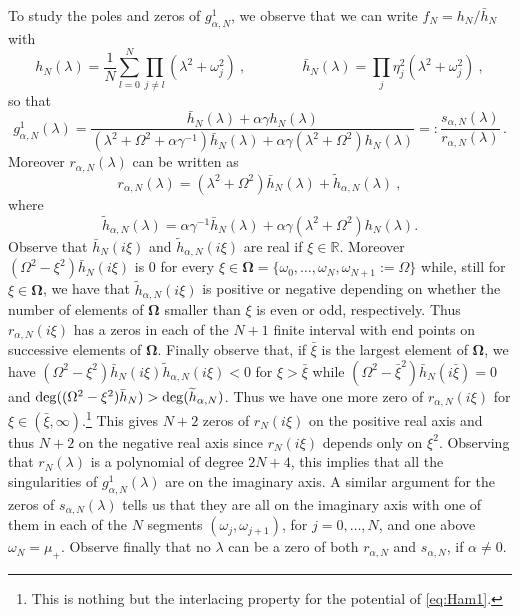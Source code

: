 \documentclass[11pt]{article}
\numberwithin{equation}{section}
\numberwithin{theorem}{section}
\def\tilde#1{\widetilde{#1}}
\begin{document}
To study the poles and zeros of $g^1_{\alpha,N}$, we observe that we can write $f_N=h_N/\bar h_N$ with
\[
 h_N(\lambda)=\frac 1N
\sum_{l=0}^N\prod_{j\not=l}(\lambda^2+\omega_j^2)\ ,\qquad\qquad \bar
h_N(\lambda)=\prod_{j}\eta_j^2(\lambda^2+\omega_j^2)\ ,
\]
so that
\[
 g^1_{\alpha,N}(\lambda)=\frac{\bar h_N(\lambda)+\alpha\gamma
h_N(\lambda)}{(\lambda^2+\Omega^2+\alpha\gamma^{-1})\bar h_N(\lambda)+
\alpha\gamma(\lambda^2+\Omega^2)h_N(\lambda)}=:\frac{s_{\alpha,N}(\lambda)}{r_{\alpha,N}(\lambda)}\, .
\]
Moreover $r_{\alpha,N}(\lambda)$ can be written as
\[
 r_{\alpha,N}(\lambda)=(\lambda^2+\Omega^2)\bar h_N(\lambda)+ \tilde
 h_{\alpha,N}(\lambda)\ ,
\]
where
\[
 \tilde h_{\alpha,N}(\lambda)=\alpha\gamma^{-1}\bar
h_N(\lambda)+\alpha\gamma(\lambda^2+\Omega^2)h_N(\lambda).
\]
Observe that $\bar h_N(i\xi)$ and $\tilde h_{\alpha,N}(i\xi)$ are real if $\xi\in\mathds R$. Moreover
$(\Omega^2-\xi^2)\bar h_N(i\xi)$ is 0 for every
$\xi\in\boldsymbol{\Omega}=\{\omega_0,\ldots,\omega_N,\omega_{N+1}:=\Omega\}$ while, still for
$\xi\in\boldsymbol{\Omega}$, we have that $\tilde h_{\alpha,N}(i\xi)$ is positive or negative depending on whether the
number of elements of $\boldsymbol{\Omega}$ smaller than $\xi$ is even or odd, respectively. Thus $r_{\alpha,N}(i\xi)$
has a zeros in each of the $N+1$ finite interval with end points on successive elements of $\boldsymbol{\Omega}$.
Finally observe that, if $\bar \xi$ is the largest element of $\boldsymbol{\Omega}$, we have $(\Omega^2-\xi^2)\bar
h_N(i\xi)\tilde h_{\alpha,N}(i\xi)<0$ for $\xi>\bar \xi$ while $(\Omega^2-\bar\xi^2)\bar h_N(i\bar \xi)=0$ and ${\rm
deg}((\Omega^2-\xi^2)\bar h_N)>{\rm deg}(\tilde h_{\alpha,N})$. Thus we have one more zero of $r_{\alpha,N}(i\xi)$ for
$\xi\in(\bar \xi,\infty)$.\footnote{This is nothing but the interlacing property for the potential of \eqref{eq:Ham1}.}
This gives $N+2$ zeros of $r_N(i\xi)$ on the positive real axis and thus $N+2$ on the negative real axis since
$r_N(i\xi)$ depends only on $\xi^2$. Observing that $r_N(\lambda)$ is a polynomial of degree $2N+4$, this implies that
all the singularities of $g^1_{\alpha,N}(\lambda)$ are on the imaginary axis. A similar argument for the zeros of
$s_{\alpha,N}(\lambda)$ tells us that they are all on the imaginary axis with one of them in each of the $N$ segments
$(\omega_j,\omega_{j+1})$, for $j=0,\ldots,N$, and one above $\omega_N=\mu_+$. Observe finally that no $\lambda$ can be
a zero of both $r_{\alpha,N}$ and $s_{\alpha,N}$, if $\alpha\not=0$.
\end{document}
